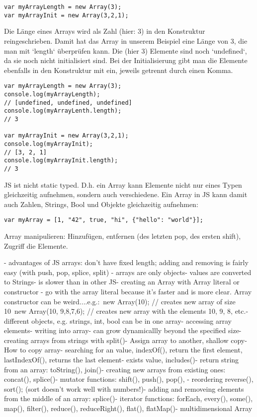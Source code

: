 \documentclass{book}
\begin{document}
\begin{lstlisting}[caption=Array Konstruktor]
var myArrayLength = new Array(3);
var myArrayInit = new Array(3,2,1);
\end{lstlisting}

Die Länge eines Arrays wird als Zahl (hier: 3) in den Konstruktur reingeschrieben. Damit hat das Array in unserem Beispiel eine Länge von 3, die man mit `length` überprüfen kann. Die (hier 3) Elemente sind noch `undefined`, da sie noch nicht initialisiert sind. Bei der Initialisierung gibt man die Elemente ebenfalls in den Konstruktur mit ein, jeweils getrennt durch einen Komma. 
\begin{lstlisting}[caption=Array Konstruktor]
var myArrayLength = new Array(3);
console.log(myArrayLength); 
// [undefined, undefined, undefined]
console.log(myArrayLenth.length); 
// 3

var myArrayInit = new Array(3,2,1);
console.log(myArrayInit); 
// [3, 2, 1]
console.log(myArrayInit.length); 
// 3
\end{lstlisting}

JS ist nicht static typed. D.h. ein Array kann Elemente nicht nur eines Typen gleichzeitig aufnehmen, sondern auch verschiedene. Ein Array in JS kann damit auch Zahlen, Strings, Bool und Objekte gleichzeitig aufnehmen:

\begin{lstlisting}[caption=Array Konstruktor]
var myArray = [1, "42", true, "hi", {"hello": "world"}];
\end{lstlisting}

Array manipulieren: Hinzufügen, entfernen (des letzten pop, des ersten shift), Zugriff die Elemente. 

- advantages of JS arrays: don't have fixed length; adding and removing is fairly easy (with push, pop, splice, split)
- arrays are only objects- values are converted to Strings- is slower than in other JS- creating an Array with Array literal or constructor - go with the array literal because it's faster and is more clear. Array constructor can be weird....e.g.: new Array(10); // creates new array of size 10 new Array(10, 9,8,7,6); // creates new array with the elements 10, 9, 8, etc.- different objects, e.g. strings, int, bool can be in one array- accessing array elements- writing into array- can grow dynamicallly beyond the specified size- creating arrays from strings with split()- Assign array to another, shallow copy- How to copy array- searching for an value, indexOf(), return the first element, lastIndexOf(), returns the last element- exists value, includes()- return string from an array: toString(), join()- creating new arrays from existing ones: concat(), splice()- mutator functions: shift(), push(), pop(), - reordering reverse(), sort(); (sort doesn't work well with numbers!)- adding and removeing elements from the middle of an array: splice()- iterator functions: forEach, every(), some(), map(), filter(), reduce(), reduceRight(), flat(), flatMap()- multidimensional Array
\end{document}
